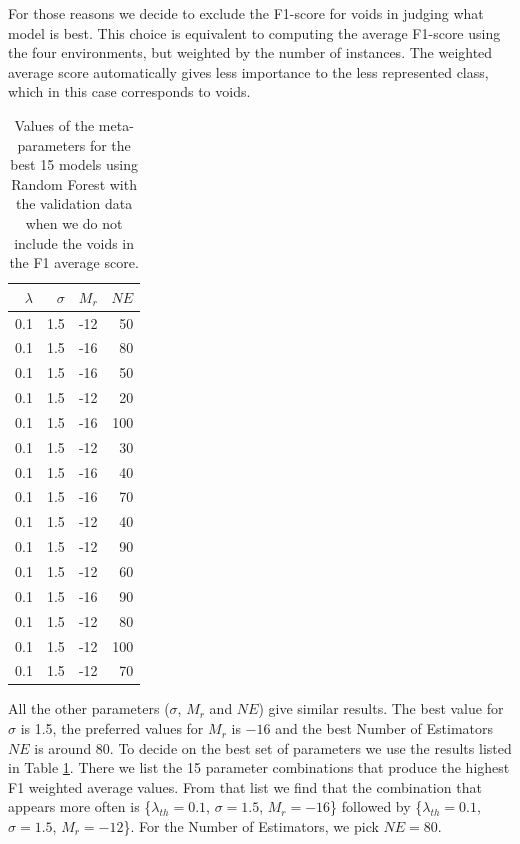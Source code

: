 \documentclass[usenatbib]{mnras}
\begin{document}
For those reasons we decide to exclude the F1-score for voids in
judging what model is best.
This choice is equivalent to computing the average F1-score using the
four environments, but weighted by the number of instances. 
The weighted average score automatically gives less importance to the
less represented class, which in this case corresponds to voids.

\begin{table}
\centering
\begin{tabular}{rrrr}
\hline
   $\lambda$ &   $\sigma$ &   $M_r$ &   $NE$ \\
\hline
         0.1 &        1.5 &     -12 &     50 \\
         0.1 &        1.5 &     -16 &     80 \\
         0.1 &        1.5 &     -16 &     50 \\
         0.1 &        1.5 &     -12 &     20 \\
         0.1 &        1.5 &     -16 &    100 \\
         0.1 &        1.5 &     -12 &     30 \\
         0.1 &        1.5 &     -16 &     40 \\
         0.1 &        1.5 &     -16 &     70 \\
         0.1 &        1.5 &     -12 &     40 \\
         0.1 &        1.5 &     -12 &     90 \\
         0.1 &        1.5 &     -12 &     60 \\
         0.1 &        1.5 &     -16 &     90 \\
         0.1 &        1.5 &     -12 &     80 \\
         0.1 &        1.5 &     -12 &    100 \\
         0.1 &        1.5 &     -12 &     70 \\
\hline
\end{tabular}
\caption{Values of the meta-parameters for the best 15 models using Random Forest with the validation data when we do not include the voids in the F1 average score.}
\label{tab:parameters}
\end{table}

All the other parameters ($\sigma$, $M_r$ and $NE$) give similar results.
The best value for $\sigma$ is 1.5, the preferred values
for $M_r$ is $-16$ and the best Number of
Estimators $NE$ is around $80$.
To decide on the best set of parameters we use the results listed in
Table \ref{tab:parameters}.
There we list the 15 parameter combinations that
produce the highest F1 weighted average values.
From that list we find that the combination that appears more often is 
\{$\lambda_{th}=0.1$, $\sigma=1.5$, $M_r=-16$\} followed by 
\{$\lambda_{th}=0.1$, $\sigma=1.5$, $M_r=-12$\}.
For the Number of Estimators, we pick $NE=80$.
\end{document}
